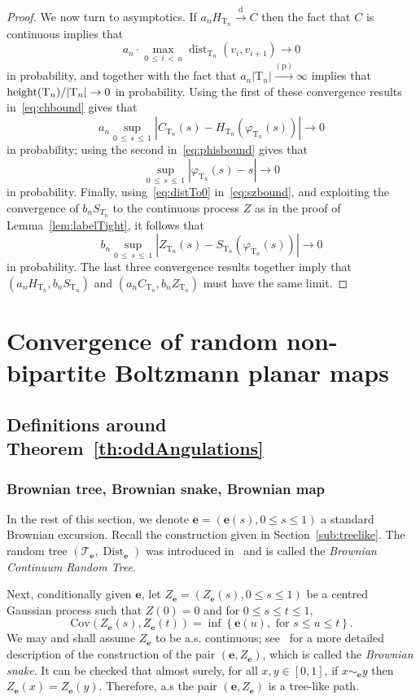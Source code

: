 \documentclass[AHL,Unicode,longabstracts,published]{cedram}
\newcommand{\bfe}{\mathbf{e}}
\newcommand{\be}{\mathbf{e}}
\newcommand{\cT}{\mathcal{T}}
\newcommand{\rT}{\mathrm{T}}
\DeclareMathOperator{\dist}{dist}
\DeclareMathOperator{\Dist}{Dist}
\DeclareMathOperator{\height}{height}
\newcommand{\convdist}{\ensuremath{\stackrel{\mathrm{d}}{\rightarrow}}}
\newcommand{\convpr}{\ensuremath{\stackrel{\mathrm{(p)}}{\longrightarrow}}}
\begin{document}
\begin{proof}
We now turn to asymptotics. If $a_nH_{\rT_n} \convdist C$ then the fact that $C$ is continuous implies that
\begin{equation}\label{eq:distTo0}
a_n \cdot \max_{0\,\le\,i\,<\,n} \dist_{\rT_n}(v_i,v_{i+1}) \to 0
\end{equation}
in probability, and together with the fact that $a_n|\rT_n| \convpr \infty$ implies that $\height(\rT_n)\linebreak /|\rT_n| \to 0$ in probability. Using the first of these convergence results in~\eqref{eq:chbound} gives that
\[
a_n\sup_{0\,\le\,s\,\le\,1} \left|C_{\rT_n}(s)-H_{\rT_n}(\varphi_{\rT_n}(s))\right| \to 0
\]
in probability; using the second in~\eqref{eq:phisbound} gives that
\[
\sup_{0\,\le\,s\,\le\,1} \left| \varphi_{\rT_n}(s)-s\right| \to 0
\]
in probability. Finally, using~\eqref{eq:distTo0} in~\eqref{eq:szbound}, and exploiting the convergence of $b_nS_{T_n}$ to the continuous process $Z$ as in the proof of Lemma~\ref{lem:labelTight}, it follows that
\[
b_n\sup_{0\,\le\,s\,\le\,1} \left|Z_{\rT_n}(s)-S_{\rT_n}(\varphi_{\rT_n}(s))\right| \to 0
\]
in probability. The last three convergence results together imply that $(a_nH_{\rT_n},b_nS_{\rT_n})$ and $(a_nC_{\rT_n},b_nZ_{\rT_n})$ must have the same limit.
\end{proof}



\section{Convergence of random non-bipartite Boltzmann planar maps}\label{sec:planarMaps}


\subsection{Definitions around Theorem~\ref{th:oddAngulations}}


\subsubsection{Brownian tree, Brownian snake, Brownian map}\label{sub:brownian}
In the rest of this section, we denote $\bfe=(\bfe(s), 0\leq s\leq 1)$ a standard Brownian excursion. Recall the construction given in Section~\ref{sub:treelike}. The random tree $(\cT_{\bfe},\Dist_{\bfe})$ was introduced in~\cite{AldousCRT2} and is called the \emph{Brownian Continuum Random Tree}.

Next, conditionally given $\bfe$, let $Z_{\be}=(Z_{\be}(s), 0\leq s \leq 1)$ be a centred Gaussian process such that $Z(0)=0$ and for $0\leq s \leq t \leq 1$,
\[
\text{Cov}\left(Z_{\be}(s),Z_{\be}(t)\right) = \inf \left\{\bfe(u), \text{ for } s\leq u\leq t\right\}.
\]
We may and shall assume $Z_{\be}$ to be a.s. continuous; see~\cite[Section~3]{LeGallSurvey} for a more detailed description of the construction of the pair $(\bfe,Z_{\be})$, which is called the \emph{Brownian snake}. It can be checked that almost surely, for all $x,y \in [0,1]$, if $x\sim_{\bfe}y$ then $Z_{\be}(x)=Z_{\be}(y)$. Therefore, a.s the pair $(\bfe,Z_{\be})$ is a tree-like path.
\end{document}
